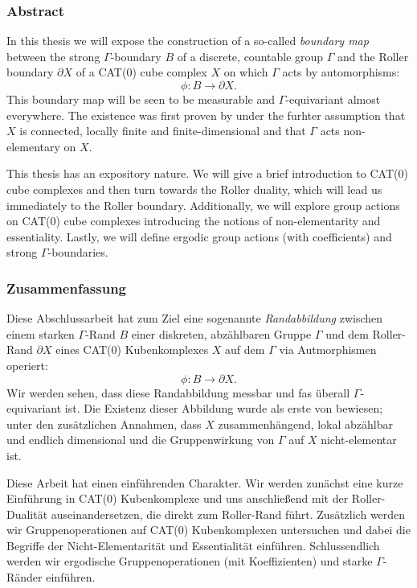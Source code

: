 \subsubsection*{Abstract}
%
\label{sec:abstract}

In this thesis we will expose the construction of a so-called \emph{boundary map} between the strong \(\Gamma\)-boundary \(B\) of a discrete, countable group \(\Gamma\) and the Roller boundary \(\partial X\) of a CAT(0) cube complex \(X\) on which \(\Gamma\) acts by automorphisms:
\[
  \phi\colon B \to \partial X.
\]
This boundary map will be seen to be measurable and \(\Gamma\)-equivariant almost everywhere. The existence was first proven by \textcite{MR3509968} under the furhter assumption that \(X\) is connected, locally finite and finite-dimensional and that \(\Gamma\) acts non-elementary on \(X\). 

This thesis has an expository nature. We will give a brief introduction to CAT(0) cube complexes and then turn towards the Roller duality, which will lead us immediately to the Roller boundary. Additionally, we will explore group actions on CAT(0) cube complexes introducing the notions of non-elementarity and essentiality. Lastly, we will define ergodic group actions (with coefficients) and strong \(\Gamma\)-boundaries.


\subsubsection*{Zusammenfassung}
\label{sec:Zusammenfassung}
Diese Abschlussarbeit hat zum Ziel eine sogenannte \emph{Randabbildung} zwischen einem starken \(\Gamma\)-Rand \(B\) einer diskreten, abzählbaren Gruppe \(\Gamma\) und dem Roller-Rand \(\partial X\) eines CAT(0) Kubenkomplexes \(X\) auf dem \(\Gamma\) via Autmorphismen operiert:
\[
  \phi\colon B \to \partial X.
\]
Wir werden sehen, dass diese Randabbildung messbar und fas überall \(\Gamma\)-equivariant ist. Die Existenz dieser Abbildung wurde als erste von \textcite{MR3509968} bewiesen; unter den zusätzlichen Annahmen, dass \(X\) zusammenhängend, lokal abzählbar und endlich dimensional und die Gruppenwirkung von \(\Gamma\) auf \(X\) nicht-elementar ist.

Diese Arbeit hat einen einführenden Charakter. Wir werden zunächst eine kurze Einführung in CAT(0) Kubenkomplexe und uns anschließend mit der Roller-Dualität auseinandersetzen, die direkt zum Roller-Rand führt. Zusätzlich werden wir Gruppenoperationen auf CAT(0) Kubenkomplexen untersuchen und dabei die Begriffe der Nicht-Elementarität und Essentialität einführen. Schlussendlich werden wir ergodische Gruppenoperationen (mit Koeffizienten) und starke \(\Gamma\)-Ränder einführen.


